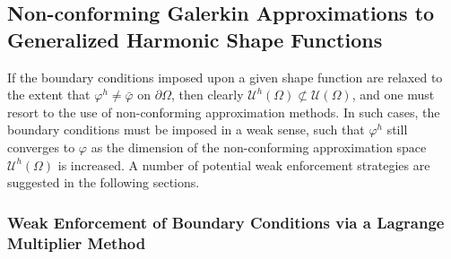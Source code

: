 \subsection*{Non-conforming Galerkin Approximations to \\ Generalized Harmonic Shape Functions}

	If the boundary conditions imposed upon a given shape function are relaxed to the extent that $\varphi^h \neq \bar{\varphi}$ on $\partial \Omega$, then clearly $\mathcal{U}^h (\Omega) \not\subset \mathcal{U} (\Omega)$, and one must resort to the use of non-conforming approximation methods. In such cases, the boundary conditions must be imposed in a weak sense, such that $\varphi^h$ still converges to $\varphi$ as the dimension of the non-conforming approximation space $\mathcal{U}^h (\Omega)$ is increased. A number of potential weak enforcement strategies are suggested in the following sections.
	
	\subsubsection*{Weak Enforcement of Boundary Conditions via a Lagrange Multiplier Method}
	
